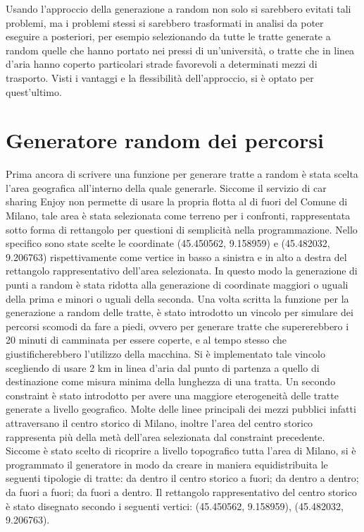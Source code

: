 Usando l'approccio della generazione a random non solo si sarebbero evitati tali problemi, ma i problemi stessi si sarebbero trasformati in analisi da poter eseguire a posteriori, per esempio selezionando da tutte le tratte generate a random quelle che hanno portato nei pressi di un'università, o tratte che in linea d'aria hanno coperto particolari strade favorevoli a determinati mezzi di trasporto. Visti i vantaggi e la flessibilità dell'approccio, si è optato per quest'ultimo.

\section{Generatore random dei percorsi}

Prima ancora di scrivere una funzione per generare tratte a random è stata scelta l'area geografica all'interno della quale generarle. Siccome il servizio di car sharing Enjoy non permette di usare la propria flotta al di fuori del Comune di Milano, tale area è stata selezionata come terreno per i confronti, rappresentata sotto forma di rettangolo per questioni di semplicità nella programmazione. Nello specifico sono state scelte le coordinate (45.450562\textdegree, 9.158959\textdegree) e (45.482032\textdegree, 9.206763\textdegree) rispettivamente come vertice in basso a sinistra e in alto a destra del rettangolo rappresentativo dell'area selezionata. In questo modo la generazione di punti a random è stata ridotta alla generazione di coordinate maggiori o uguali della prima e minori o uguali della seconda. Una volta scritta la funzione per la generazione a random delle tratte, è stato introdotto un vincolo per simulare dei percorsi scomodi da fare a piedi, ovvero per generare tratte che supererebbero i 20 minuti di camminata per essere coperte, e al tempo stesso che giustificherebbero l'utilizzo della macchina. Si è implementato tale vincolo scegliendo di usare 2 km in linea d'aria dal punto di partenza a quello di destinazione come misura minima della lunghezza di una tratta. Un secondo constraint è stato introdotto per avere una maggiore eterogeneità delle tratte generate a livello geografico. Molte delle linee principali dei mezzi pubblici infatti attraversano il centro storico di Milano, inoltre l'area del centro storico rappresenta più della metà dell'area selezionata dal constraint precedente. Siccome è stato scelto di ricoprire a livello topografico tutta l'area di Milano, si è programmato il generatore in modo da creare in maniera equidistribuita le seguenti tipologie di tratte: da dentro il centro storico a fuori; da dentro a dentro; da fuori a fuori; da fuori a dentro. Il rettangolo rappresentativo del centro storico è stato disegnato secondo i seguenti vertici: (45.450562\textdegree, 9.158959\textdegree), (45.482032\textdegree, 9.206763\textdegree).

